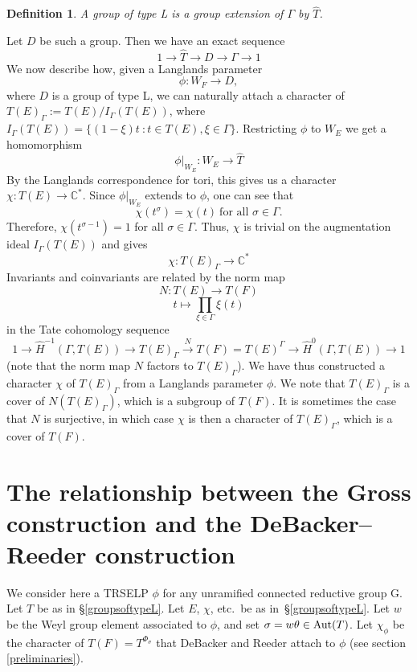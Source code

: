 \documentclass[11pt]{amsart}
\theoremstyle{plain}
\newtheorem{definition}[enumi]{Definition}
\begin{document}
\begin{definition}
A \emph{group of type L} is a group extension of $\Gamma$ by $\hat{T}$.
\end{definition}

Let $D$ be such a group.  Then we have an exact sequence
$$1 \rightarrow \hat{T} \rightarrow D \rightarrow \Gamma \rightarrow 1$$
We now describe how, given a Langlands parameter $$\phi : W_F \rightarrow D,$$ where $D$ is a group of type L, we can naturally attach a character of $T(E)_{\Gamma} := T(E) / I_{\Gamma}(T(E))$, where $I_{\Gamma}(T(E)) = \{(1 - \xi)t \ : t \in T(E), \xi \in \Gamma \}$.
Restricting $\phi$ to $W_E$ we get a homomorphism $$\phi|_{W_E} : W_E \rightarrow \hat{T}$$
By the Langlands correspondence for tori, this gives us a character $\chi : T(E) \rightarrow \mathbb{C}^*$.  Since $\phi|_{W_E}$ extends to $\phi$, one can see that
$$\chi(t^{\sigma}) = \chi(t)\ \mbox{for all $\sigma \in \Gamma$.}$$
Therefore, $\chi(t^{\sigma - 1}) = 1$ for all $\sigma \in \Gamma$.  Thus, $\chi$ is trivial on the augmentation ideal $I_{\Gamma}(T(E))$
and gives $$\chi : T(E)_\Gamma \rightarrow \mathbb{C}^*$$
Invariants and coinvariants are related by the norm map $$N : T(E) \rightarrow T(F)$$ $$t \mapsto \displaystyle\prod_{\xi \in \Gamma} \xi(t)$$ in the Tate cohomology sequence
$$1 \rightarrow \hat{H}^{-1}(\Gamma,T(E)) \rightarrow T(E)_{\Gamma} \xrightarrow{N} T(F) = T(E)^{\Gamma} \rightarrow \hat{H}^0(\Gamma,T(E)) \rightarrow 1$$ (note that the norm map $N$ factors to $T(E)_{\Gamma}$).
We have thus constructed a character $\chi$ of $T(E)_{\Gamma}$ from a Langlands parameter $\phi$. We note that $T(E)_{\Gamma}$ is a cover of $N(T(E)_{\Gamma})$, which is a subgroup of $T(F)$.  It is sometimes the case that $N$ is surjective, in which case $\chi$ is then a character of $T(E)_{\Gamma}$, which is a cover of $T(F)$.

\section{The relationship between the Gross construction and the DeBacker--Reeder construction}\label{grossdebackerreeder}

We consider here a TRSELP $\phi$ for any unramified connected reductive group G.  Let $T$ be as in \S\ref{groupsoftypeL}.  Let $E$, $\chi$, etc.~be as in~\S\ref{groupsoftypeL}.  Let $w$ be the Weyl group element associated to $\phi$, and set $\sigma = w \theta\in {\rm Aut}(T)$.  Let $\chi_{\phi}$ be the character of $T(F) = T^{\Phi_{\sigma}}$ that DeBacker and Reeder attach to $\phi$ (see section \ref{preliminaries}).
\end{document}
